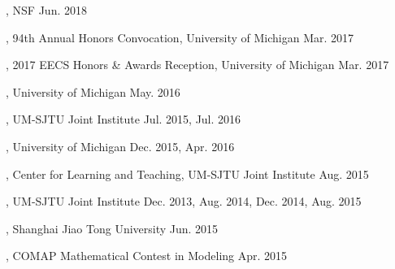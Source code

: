 
\begin{cvhonors}
  \cvhonor
    {, NSF} %
    {Jun. 2018} %
  
  \cvhonor
    {, 94th Annual Honors Convocation, University of Michigan} %
    {Mar. 2017} %
  
  \cvhonor
    {, 2017 EECS Honors \& Awards Reception, University of Michigan} %
    {Mar. 2017} %
  
  \cvhonor
    {, University of Michigan} %
    {May. 2016} %

  \cvhonor
    {, UM-SJTU Joint Institute} %
    {Jul. 2015, Jul. 2016} %

  \cvhonor
    {, University of Michigan} %
    {Dec. 2015, Apr. 2016} %

  \cvhonor
    {, Center for Learning and Teaching, UM-SJTU Joint Institute} %
    {Aug. 2015} %

  \cvhonor
    {, UM-SJTU Joint Institute} %
    {Dec. 2013, Aug. 2014, Dec. 2014, Aug. 2015} %

  \cvhonor
    {, Shanghai Jiao Tong University} %
    {Jun. 2015} %

  \cvhonor
    {, COMAP Mathematical Contest in Modeling} %
    {Apr. 2015} %

\end{cvhonors}

